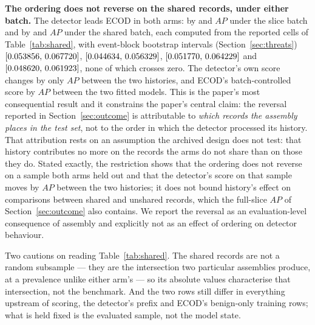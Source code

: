 \documentclass[manuscript,anonymous,review]{acmart}
\begin{document}
\textbf{The ordering does not reverse on the shared records, under either
batch.} The detector leads ECOD in both arms: by \RevSharedMarginNatural{} and
\RevSharedMarginSynthetic{} $AP$ under the slice batch and by
\RefMarginSharedSevenEightNatural{} and \RefMarginSharedSevenEightSynthetic{} $AP$ under the
shared batch, each computed from the reported cells of
Table~\ref{tab:shared}, with event-block
bootstrap intervals (Section~\ref{sec:threats})
$[0.053856,\,0.067720]$,
$[0.044634,\,0.056329]$,
$[0.051770,\,0.064229]$ and
$[0.048620,\,0.061923]$, none
of which crosses zero. The detector's own score changes by only
\RevSharedDetectorSpread{} $AP$ between the two histories, and ECOD's
batch-controlled score by \RefEcodSharedSevenEightCrossArmSpread{} $AP$ between the two
fitted models. This is the paper's most consequential result and it constrains
the paper's central claim: the reversal reported in Section~\ref{sec:outcome}
is attributable to \emph{which records the assembly places in the test set},
not to the order in which the detector processed its history. That attribution
rests on an assumption the archived design does not test: that history
contributes no more on the records the arms do not share than on those they
do. Stated exactly, the restriction shows that the ordering does not reverse on
a sample both arms held out and that the detector's score on that sample moves
by \RevSharedDetectorSpread{} $AP$ between the two histories; it does not bound
history's effect on comparisons between shared and unshared records, which the
full-slice $AP$ of Section~\ref{sec:outcome} also contains. We report the
reversal as an evaluation-level consequence of assembly and
explicitly not as an effect of ordering on detector behaviour.

Two cautions on reading Table~\ref{tab:shared}. The shared records are not a
random subsample --- they are the intersection two particular assemblies
produce, at a prevalence unlike either arm's --- so its absolute values
characterise that intersection, not the benchmark. And the two rows still
differ in everything upstream of scoring, the detector's prefix and ECOD's
benign-only training rows; what is held fixed is the evaluated sample, not the
model state.
\end{document}
